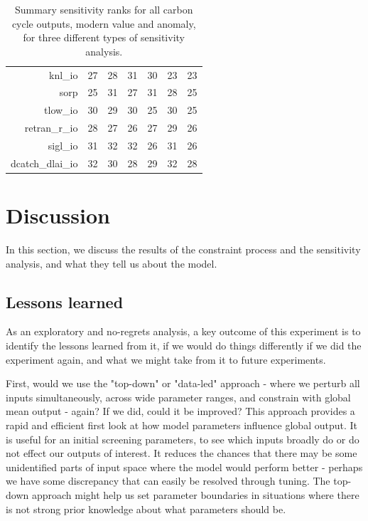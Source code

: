 \documentclass[gmd, manuscript]{copernicus}
\begin{document}
\begin{table}[ht]
\begin{tabular}{rrrrrrr}
  knl\_io & 27 & 28 & 31 & 30 & 23 & 23 \\ 
  sorp & 25 & 31 & 27 & 31 & 28 & 25 \\ 
  tlow\_io & 30 & 29 & 30 & 25 & 30 & 25 \\ 
  retran\_r\_io & 28 & 27 & 26 & 27 & 29 & 26 \\ 
  sigl\_io & 31 & 32 & 32 & 26 & 31 & 26 \\ 
  dcatch\_dlai\_io & 32 & 30 & 28 & 29 & 32 & 28 \\ 
   \hline
\end{tabular}
\caption{Summary sensitivity ranks for all carbon cycle outputs, modern value and anomaly, for three different types of sensitivity analysis.}
\label{tab:sensitivity_ranks}
\end{table}



\section{Discussion}\label{sec:discussion}
In this section, we discuss the results of the constraint process and the sensitivity analysis, and what they tell us about the model.

\subsection{Lessons learned}\label{ssec:lessons}

As an exploratory and no-regrets analysis, a key outcome of this experiment is to identify the lessons learned from it, if we would do things differently if we did the experiment again, and what we might take from it to future experiments.

First, would we use  the "top-down" or "data-led" approach - where we perturb all inputs simultaneously, across wide parameter ranges, and constrain with global mean output - again? If we did, could it be improved? This approach provides a rapid and efficient first look at how model parameters influence global output. It is useful for an initial screening parameters, to see which inputs broadly do or do not effect our outputs of interest. It reduces the chances that there may be some unidentified parts of input space where the model would perform better - perhaps we have some discrepancy that can easily be resolved through tuning. The top-down approach might help us set parameter boundaries in situations where there is not strong prior knowledge about what parameters should be.
\end{document}
